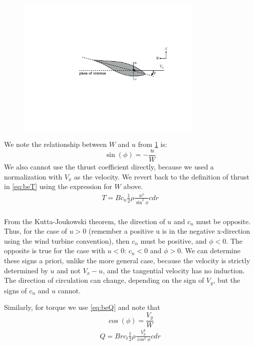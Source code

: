 \documentclass{article}
\begin{document}
\begin{figure}[htbp]
    \centering
    \includegraphics[width=3.5in]{figures/inflow4}
    \caption{}
    \label{fig:inflowu}
\end{figure}

We note the relationship between $W$ and $u$ from \cref{fig:inflowu} is:
\begin{equation}
    \sin(\phi) = -\frac{u}{W}
\end{equation}
We also cannot use the thrust coefficient directly, because we used a normalization with $V_x$ as the velocity.  We revert back to the definition of thrust in \cref{eq:beT} using the expression for $W$ above.
\begin{equation}
\begin{aligned}
    T = B c_n \frac{1}{2}\rho \frac{u^2}{\sin^2 \phi} c dr\\
\end{aligned}
\end{equation}

From the Kutta-Joukowski theorem, the direction of $u$ and $c_n$ must be opposite.  Thus, for the case of $u > 0$ (remember a positive u is in the negative x-direction using the wind turbine convention), then $c_n$ must be positive, and $\phi < 0$.  The opposite is true for the case with $u < 0$: $c_n < 0$ and $\phi > 0$.  We can determine these signs a priori, unlike the more general case, because the velocity is strictly determined by $u$ and not $V_x - u$, and the tangential velocity has no induction.  The direction of circulation can change, depending on the sign of $V_y$, but the signs of $c_n$ and $u$ cannot.


Similarly, for torque we use \cref{eq:beQ} and note that
\begin{equation}
    \cos(\phi) = \frac{V_y}{W}
\end{equation}
\begin{equation}
\begin{aligned}
Q = B r c_t \frac{1}{2}\rho \frac{V_y^2}{\cos^2 \phi} c dr\\
\end{aligned}
\end{equation}
\end{document}
